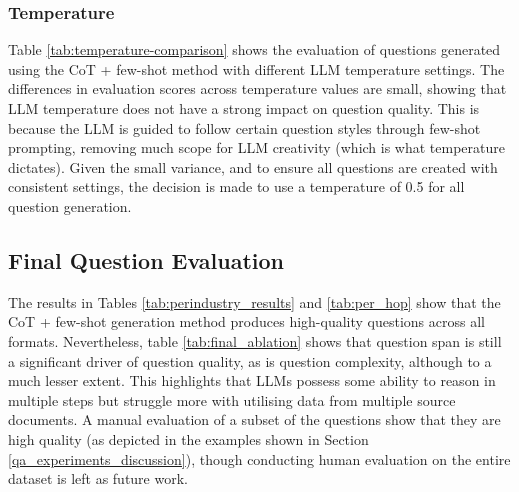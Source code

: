 \subsubsection{Temperature}

Table \ref{tab:temperature-comparison} shows the evaluation of questions generated using the CoT + few-shot method with different LLM temperature settings. The differences in evaluation scores across temperature values are small, showing that LLM temperature does not have a strong impact on question quality. This is because the LLM is guided to follow certain question styles through few-shot prompting, removing much scope for LLM creativity (which is what temperature dictates). Given the small variance, and to ensure all questions are created with consistent settings, the decision is made to use a temperature of 0.5 for all question generation. 

\subsection{Final Question Evaluation}


The results in Tables \ref{tab:perindustry_results} and \ref{tab:per_hop} show that the CoT + few-shot generation method produces high-quality questions across all formats. Nevertheless, table \ref{tab:final_ablation} shows that question span is still a significant driver of question quality, as is question complexity, although to a much lesser extent. This highlights that LLMs possess some ability to reason in multiple steps but struggle more with utilising data from multiple source documents. A manual evaluation of a subset of the questions show that they are high quality (as depicted in the examples shown in Section \ref{qa_experiments_discussion}), though conducting human evaluation on the entire dataset is left as future work.

